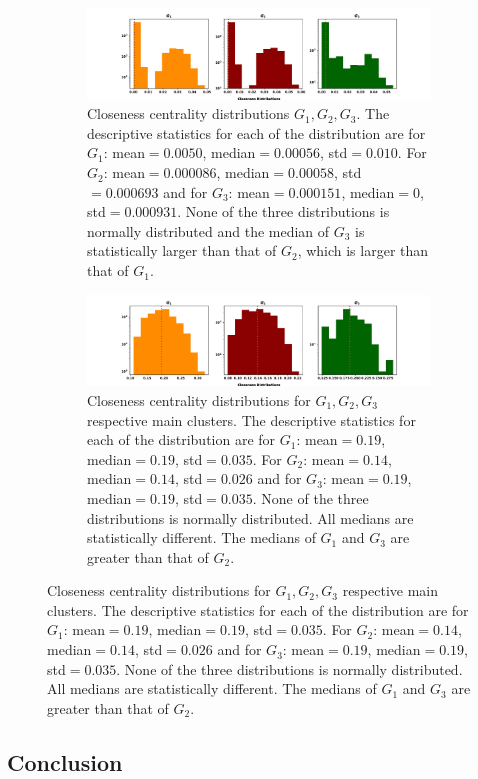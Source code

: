 \documentclass{article}
\theoremstyle{definition}
\begin{document}
\begin{figure}[!hbtp]
    \centering
    \begin{subfigure}{\textwidth}\centering
    \includegraphics[width=\textwidth]{./assets/images/closeness_distributions.pdf}
    \caption{Closeness centrality distributions \(G_1, G_2, G_3\). The descriptive
        statistics for each of the distribution are for \(G_1\): mean\(=0.0050\),
        median\(=0.00056\), std\(=0.010\). For \(G_2\): mean\(=0.000086\), median\(=0.00058\),
        std\(=0.000693\) and for \(G_3\): mean\(=0.000151\), median\(=0\), std\(=0.000931\).
        None of the three distributions is normally distributed and the median
        of \(G_3\) is statistically larger than that of \(G_2\), which is
        larger than that of \(G_1\).}\label{fig:closeness_dist}
\end{subfigure}
\begin{subfigure}{\textwidth}\centering
    \centering
    \includegraphics[width=\textwidth]{./assets/images/closeness_distributions_clusters.pdf}
    \caption{Closeness centrality distributions for \(G_1, G_2, G_3\) respective
    main clusters. The descriptive statistics for each of the distribution are
    for \(G_1\): mean\(=0.19\),
    median\(=0.19\), std\(=0.035\). For \(G_2\): mean\(=0.14\), median\(=0.14\),
    std\(=0.026\) and for \(G_3\): mean\(=0.19\), median\(=0.19\), std\(=0.035\).
    None of the three distributions is normally distributed. All medians
    are statistically different. The medians of \(G_1\) and \(G_3\) are greater
    than that of \(G_2\).}\label{fig:closeness_dist_cluster}
    \end{subfigure}
\end{figure}

\subsection{Conclusion}
%
\end{document}
